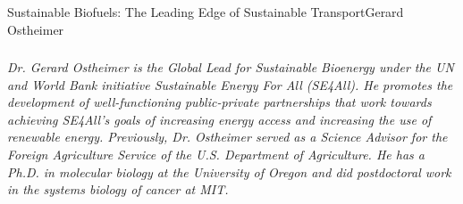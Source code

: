 \documentclass[10pt]{papertex}
\begin{document}
\begin{news}{2}{Sustainable Biofuels: The Leading Edge of Sustainable 
    Transport}{Gerard Ostheimer}{}{}
\subsubsection*{}

\emph{Dr. Gerard Ostheimer is the Global Lead for Sustainable Bioenergy under 
the UN and World Bank initiative Sustainable Energy For All (SE4All). He 
promotes the development of well-functioning public-private partnerships that 
work towards achieving SE4All’s goals of increasing energy access and 
increasing the use of renewable energy. Previously, Dr. Ostheimer served as 
a Science Advisor for the Foreign Agriculture Service of the U.S. Department 
of Agriculture. He has a Ph.D. in molecular biology at the University of 
Oregon and did postdoctoral work in the systems biology of cancer at MIT.}

\end{news}
\end{document}
